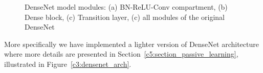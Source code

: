 \begin{figure}[h!]
    \centering  
    \caption{DenseNet model modules: (a) BN-ReLU-Conv compartment, (b) Dense block, (c) Transition layer, (c) all modules of the original DenseNet}
    \label{c3:densenet_arch_modules}
\end{figure}


More specifically we have implemented a lighter version of DenseNet architecture where more details are presented in Section~\ref{c5:section_passive_learning}, illustrated in Figure~\ref{c3:densenet_arch}.

